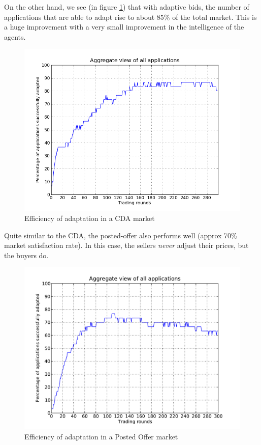 \documentclass[10pt,journal,compsoc]{IEEEtran}
\begin{document}
On the other hand, we see (in figure \ref{fig:cda_zip_market_satisfaction}) that with adaptive bids, the number of applications that are able to adapt rise to about 85\% of the total market. This is a huge improvement with a very small improvement in the intelligence of the agents.
\begin{figure}[h]
	\centering
	 \includegraphics[scale=0.45, clip, trim=0cm 1cm 2cm 0.8cm]{graphs/probabilistic-change-to-qa.png}
	 \caption{Efficiency of adaptation in a CDA market \label{fig:cda_zip_market_satisfaction}}
\end{figure} 

Quite similar to the CDA, the posted-offer also performs well (approx 70\% market satisfaction rate). In this case, the sellers \textit{never} adjust their prices, but the buyers do. 

\begin{figure}[h]
	\centering
	\includegraphics[scale=0.45]{graphs/posted_offer_2_cand_3_qa.pdf}
	\caption{Efficiency of adaptation in a Posted Offer market \label{fig:posted_offer_market_satisfaction}}
\end{figure}
\end{document}
